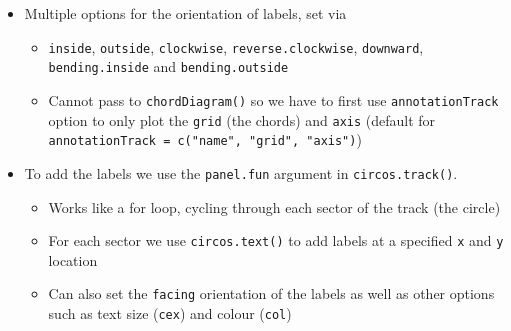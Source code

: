 \documentclass[
]{book}
\newenvironment{Shaded}{\begin{snugshade}}{\end{snugshade}}
\newcommand{\AttributeTok}[1]{\textcolor[rgb]{0.77,0.63,0.00}{#1}}
\newcommand{\CommentTok}[1]{\textcolor[rgb]{0.56,0.35,0.01}{\textit{#1}}}
\newcommand{\ConstantTok}[1]{\textcolor[rgb]{0.00,0.00,0.00}{#1}}
\newcommand{\DecValTok}[1]{\textcolor[rgb]{0.00,0.00,0.81}{#1}}
\newcommand{\FloatTok}[1]{\textcolor[rgb]{0.00,0.00,0.81}{#1}}
\newcommand{\FunctionTok}[1]{\textcolor[rgb]{0.00,0.00,0.00}{#1}}
\newcommand{\NormalTok}[1]{#1}
\newcommand{\SpecialCharTok}[1]{\textcolor[rgb]{0.00,0.00,0.00}{#1}}
\newcommand{\StringTok}[1]{\textcolor[rgb]{0.31,0.60,0.02}{#1}}
\providecommand{\tightlist}{%
  \setlength{\itemsep}{0pt}\setlength{\parskip}{0pt}}
\begin{document}
\begin{itemize}
\tightlist
\item
  Multiple options for the orientation of labels, set via

  \begin{itemize}
  \tightlist
  \item
    \texttt{inside}, \texttt{outside}, \texttt{clockwise}, \texttt{reverse.clockwise}, \texttt{downward}, \texttt{bending.inside} and \texttt{bending.outside}
  \item
    Cannot pass to \texttt{chordDiagram()} so we have to first use \texttt{annotationTrack} option to only plot the \texttt{grid} (the chords) and \texttt{axis} (default for \texttt{annotationTrack\ =\ c("name",\ "grid",\ "axis")})
  \end{itemize}
\item
  To add the labels we use the \texttt{panel.fun} argument in \texttt{circos.track()}.

  \begin{itemize}
  \tightlist
  \item
    Works like a for loop, cycling through each sector of the track (the circle)
  \item
    For each sector we use \texttt{circos.text()} to add labels at a specified \texttt{x} and \texttt{y} location
  \item
    Can also set the \texttt{facing} orientation of the labels as well as other options such as text size (\texttt{cex}) and colour (\texttt{col})
  \end{itemize}
\end{itemize}

\begin{Shaded}
\end{Shaded}
\end{document}

